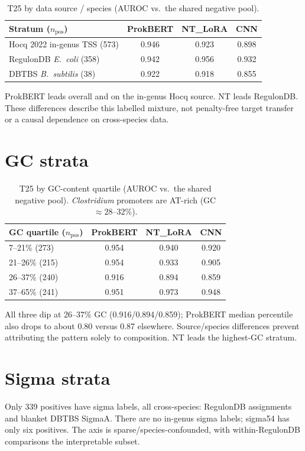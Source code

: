 \documentclass{article}
\begin{document}
\begin{table}[h]
\centering
\caption{T25 by data source / species (AUROC vs.\ the shared negative pool).}
\begin{tabular}{lccc}
\toprule
Stratum ($n_{\text{pos}}$) & ProkBERT & NT\_LoRA & CNN \\
\midrule
Hocq 2022 in-genus TSS (573)   & 0.946 & 0.923 & 0.898 \\
RegulonDB \emph{E.\ coli} (358) & 0.942 & 0.956 & 0.932 \\
DBTBS \emph{B.\ subtilis} (38) & 0.922 & 0.918 & 0.855 \\
\bottomrule
\end{tabular}
\end{table}

ProkBERT leads overall and on the in-genus Hocq source. NT leads RegulonDB. These differences describe this labelled mixture, not penalty-free target transfer or a causal dependence on cross-species data.

\section{GC strata}
\begin{table}[h]
\centering
\caption{T25 by GC-content quartile (AUROC vs.\ the shared negative pool). \emph{Clostridium} promoters are AT-rich (GC $\approx 28$--$32\%$).}
\begin{tabular}{lccc}
\toprule
GC quartile ($n_{\text{pos}}$) & ProkBERT & NT\_LoRA & CNN \\
\midrule
7--21\% (273)  & 0.954 & 0.940 & 0.920 \\
21--26\% (215) & 0.954 & 0.933 & 0.905 \\
26--37\% (240) & 0.916 & 0.894 & 0.859 \\
37--65\% (241) & 0.951 & 0.973 & 0.948 \\
\bottomrule
\end{tabular}
\end{table}

All three dip at 26--37\% GC (0.916/0.894/0.859); ProkBERT median percentile also drops to about 0.80 versus 0.87 elsewhere. Source/species differences prevent attributing the pattern solely to composition. NT leads the highest-GC stratum.

\section{Sigma strata}
Only 339 positives have sigma labels, all cross-species: RegulonDB assignments and blanket DBTBS SigmaA. There are no in-genus sigma labels; sigma54 has only six positives. The axis is sparse/species-confounded, with within-RegulonDB comparisons the interpretable subset.
\end{document}
